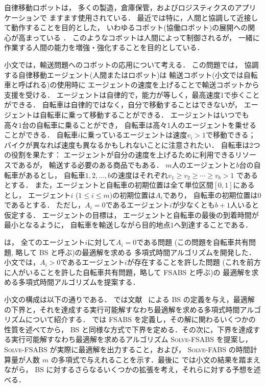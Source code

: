 
自律移動ロボットは，
多くの製造，倉庫保管，およびロジスティクスのアプリケーションで
ますます使用されている．
最近では特に，人間と協調して近接して動作することを目的とした，
いわゆるコボット(協働ロボット)の展開への関心が高まっている \cite{4154820,wiki,6386300}．
このようなコボットは人間によって制御されるが，
一緒に作業する人間の能力を増強・強化することを目的としている．

小文では，輸送問題へのコボットの応用について考える．
この問題では，
協調する自律移動エージェント(人間またはロボット)は
輸送コボット(小文では自転車と呼ばれる)の使用時に
エージェントの速度を上げることで輸送コボットから支援を受ける．
エージェントは自律的で，能力が等しく，最高速度1で歩くことができる．
自転車は自律的ではなく，自分で移動することはできないが，
エージェントは自転車に乗って移動することができる．
エージェントはいつでも高々$1$台の自転車に乗ることができ，
自転車は高々1人のエージェントを乗せることができる．
自転車$i$に乗っているエージェントは速度$v_i>1$で移動できる；
バイクが異なれば速度も異なるかもしれないことに注意されたい．
自転車は2つの役割を果たす：
エージェントが自分の速度を上げるために利用できるリソースであるが，
輸送する必要のある商品でもある．
$m$人のエージェントと$b$台の自転車があるとし，
自転車$1,2,\ldots,b$の速度はそれぞれ$v_1\ge v_2\ge\cdots\ge v_b>1$
であるとする．
また，エージェントと自転車の初期位置は全て単位区間$[0,1]$にあるとし，
エージェント$i$ ($1\le i\le m$)の初期位置は$A_i$であり，
自転車の初期位置は$0$であるとする．
ただし，$A_i=0$であるエージェント$i$が少なくとも$b+1$人いると仮定する．
エージェントの目標は，
エージェントと自転車の最後の到着時間が最小となるように，
自転車を輸送しながら目的地点$1$へ到達することである．

\textcite{czyzowicz} は，
全てのエージェント$i$に対して$A_i=0$である問題
(この問題を自転車共有問題, 略して BS と呼ぶ)の最適解を求める
多項式時間アルゴリズムを開発した．
小文では，$A_i>0$であるエージェント$i$が存在することを許した問題
(これを前方に人がいることを許した自転車共有問題，略して FSABS と呼ぶ)の
最適解を求める多項式時間アルゴリズムを提案する．

小文の構成は以下の通りである． では文献~\cite{czyzowicz} による BS の定義を与え，最適解の下界と，それを達成する実行可能解すなわち最適解を求める多項式時間アルゴリズムについて紹介する． では FSABS を定義し，その解に関わるいくつかの性質を述べてから， BS と同様な方式で下界を定める．その次に，下界を達成する実行可能解すなわち最適解を求めるアルゴリズム \textsc{Solve-FSABS} を提案し， \textsc{Solve-FSABS} が実際に最適解を出力すること，および， \textsc{Solve-FABS} の時間計算量が人数 $m$ の多項式で与えれることを示す．最後に では小文の結果を踏まえながら， BS に対するさらなるいくつかの拡張を考え，それらに対する予想を述べる．
